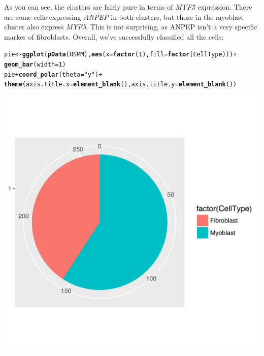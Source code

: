 \documentclass[10pt,oneside]{article}\usepackage[]{graphicx}\usepackage[]{color}
\makeatletter
\def\maxwidth{ %
  \ifdim\Gin@nat@width>\linewidth
    \linewidth
  \else
    \Gin@nat@width
  \fi
}
\newcommand{\hlnum}[1]{\textcolor[rgb]{0.686,0.059,0.569}{#1}}%
\newcommand{\hlstr}[1]{\textcolor[rgb]{0.192,0.494,0.8}{#1}}%
\newcommand{\hlopt}[1]{\textcolor[rgb]{0,0,0}{#1}}%
\newcommand{\hlstd}[1]{\textcolor[rgb]{0.345,0.345,0.345}{#1}}%
\newcommand{\hlkwb}[1]{\textcolor[rgb]{0.69,0.353,0.396}{#1}}%
\newcommand{\hlkwc}[1]{\textcolor[rgb]{0.333,0.667,0.333}{#1}}%
\newcommand{\hlkwd}[1]{\textcolor[rgb]{0.737,0.353,0.396}{\textbf{#1}}}%
\newenvironment{kframe}{%
 \def\at@end@of@kframe{}%
 \ifinner\ifhmode%
  \def\at@end@of@kframe{\end{minipage}}%
  \begin{minipage}{\columnwidth}%
 \fi\fi%
 \def\FrameCommand##1{\hskip\@totalleftmargin \hskip-\fboxsep
 \colorbox{shadecolor}{##1}\hskip-\fboxsep
     \hskip-\linewidth \hskip-\@totalleftmargin \hskip\columnwidth}%
 \MakeFramed {\advance\hsize-\width
   \@totalleftmargin\z@ \linewidth\hsize
   \@setminipage}}%
 {\par\unskip\endMakeFramed%
 \at@end@of@kframe}
\newenvironment{knitrout}{}{} %
\makeatother
\begin{document}
As you can see, the clusters are fairly pure in terms of \emph{MYF5} expression. There are some cells expressing \emph{ANPEP} in both clusters, but those in the myoblast cluster also express \emph{MYF5}. This is not surprising, as ANPEP isn't a very specific marker of fibroblasts. Overall, we've successfully classified all the cells:
 
\begin{knitrout}
\color{fgcolor}\begin{kframe}
\begin{alltt}
\hlstd{pie} \hlkwb{<-} \hlkwd{ggplot}\hlstd{(}\hlkwd{pData}\hlstd{(HSMM),} \hlkwd{aes}\hlstd{(}\hlkwc{x} \hlstd{=} \hlkwd{factor}\hlstd{(}\hlnum{1}\hlstd{),} \hlkwc{fill} \hlstd{=} \hlkwd{factor}\hlstd{(CellType)))} \hlopt{+}
  \hlkwd{geom_bar}\hlstd{(}\hlkwc{width} \hlstd{=} \hlnum{1}\hlstd{)}
\hlstd{pie} \hlopt{+} \hlkwd{coord_polar}\hlstd{(}\hlkwc{theta} \hlstd{=} \hlstr{"y"}\hlstd{)} \hlopt{+}
  \hlkwd{theme}\hlstd{(}\hlkwc{axis.title.x}\hlstd{=}\hlkwd{element_blank}\hlstd{(),} \hlkwc{axis.title.y}\hlstd{=}\hlkwd{element_blank}\hlstd{())}
\end{alltt}
\end{kframe}

{\centering \includegraphics[width=\maxwidth]{figure/count_cells_semisup_pie-1} 

}



\end{knitrout}
 
\end{document}
